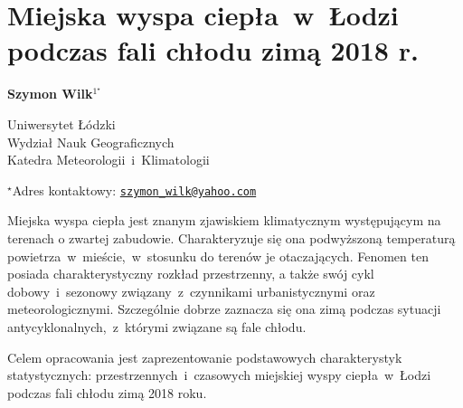\documentclass[\main/boa.tex]{subfiles}
\begin{document}
\section{Miejska wyspa ciepła~w~Łodzi podczas fali chłodu zimą 2018 r.}

\begin{center}
  {\bf {} Szymon Wilk$^{1^\star}$}
\end{center}

\vskip 0.3cm

\begin{affiliations}
\begin{enumerate}
\begin{minipage}{0.915\textwidth}
\centering
\item Uniwersytet Łódzki \\ Wydział Nauk Geograficznych \\ Katedra Meteorologii~i~Klimatologii\\[-2pt]
\end{minipage}
\end{enumerate}
$^\star$Adres kontaktowy: \href{mailto:szymon_wilk@yahoo.com}{\nolinkurl{szymon_wilk@yahoo.com}}\\
\end{affiliations}

\vskip 0.5cm


\vskip 0.5cm

Miejska wyspa ciepła jest znanym zjawiskiem klimatycznym występującym na terenach o zwartej zabudowie. Charakteryzuje się ona podwyższoną temperaturą powietrza~w~mieście,~w~stosunku do terenów je otaczających. Fenomen ten posiada charakterystyczny rozkład przestrzenny, a także swój cykl dobowy~i~sezonowy związany~z~czynnikami urbanistycznymi oraz meteorologicznymi. Szczególnie dobrze zaznacza się ona zimą podczas sytuacji antycyklonalnych,~z~którymi związane są fale chłodu.

	Celem opracowania jest zaprezentowanie podstawowych charakterystyk statystycznych: przestrzennych~i~czasowych miejskiej wyspy ciepła~w~Łodzi podczas fali chłodu zimą 2018 roku.
\end{document}

